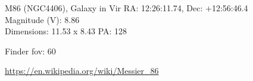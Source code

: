 \begin{block}{M86 (NGC4406), Galaxy in Vir}
    RA: 12:26:11.74, Dec: +12:56:46.4 \\ 
    Magnitude (V): 8.86 \\ 
    Dimensions: 11.53 x 8.43 PA: 128 

    Finder fov: 60 

    \url{https://en.wikipedia.org/wiki/Messier_86} 
\end{block}